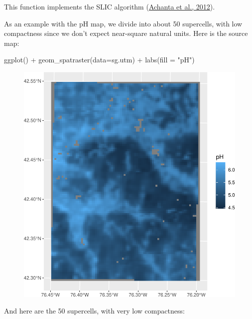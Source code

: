 \documentclass[
  letterpaper,
  DIV=11,
  numbers=noendperiod]{scrartcl}
\newenvironment{Shaded}{\begin{snugshade}}{\end{snugshade}}
\newcommand{\AttributeTok}[1]{\textcolor[rgb]{0.40,0.45,0.13}{#1}}
\newcommand{\FunctionTok}[1]{\textcolor[rgb]{0.28,0.35,0.67}{#1}}
\newcommand{\NormalTok}[1]{\textcolor[rgb]{0.00,0.23,0.31}{#1}}
\newcommand{\SpecialCharTok}[1]{\textcolor[rgb]{0.37,0.37,0.37}{#1}}
\newcommand{\StringTok}[1]{\textcolor[rgb]{0.13,0.47,0.30}{#1}}
\begin{document}
This function implements the SLIC algorithm
(\protect\hyperlink{ref-achantaSLICSuperpixelsCompared2012}{Achanta et
al., 2012}).

As an example with the pH map, we divide into about 50 supercells, with
low compactness since we don't expect near-square natural units. Here is
the source map:

\begin{Shaded}
\begin{Highlighting}[]
\FunctionTok{ggplot}\NormalTok{() }\SpecialCharTok{+}
  \FunctionTok{geom\_spatraster}\NormalTok{(}\AttributeTok{data=}\NormalTok{sg.utm) }\SpecialCharTok{+}
  \FunctionTok{labs}\NormalTok{(}\AttributeTok{fill =} \StringTok{"pH"}\NormalTok{)}
\end{Highlighting}
\end{Shaded}

\begin{figure}[H]

{\centering \includegraphics{PatternAnalysisWorkshopTutorial_files/figure-pdf/SLIC-source-1.pdf}

}

\end{figure}

And here are the 50 supercells, with very low compactness:
\end{document}
